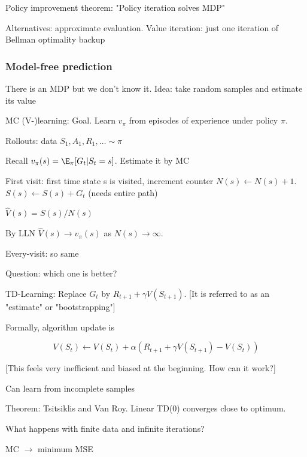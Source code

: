 \documentclass[english]{article}
\begin{document}
\item Policy improvement theorem: "Policy iteration solves MDP"

\item Alternatives: approximate evaluation. Value iteration: just one iteration of Bellman optimality backup

\eenum 


\subsubsection{Model-free prediction}
\benum

\item There is an MDP but we don't know it. Idea: take random samples and estimate its value

\item MC (V-)learning: Goal. Learn $v_\pi$ from episodes of experience under policy $\pi$. 

Rollouts: data $S_1,A_1,R_1,\ldots \sim \pi$

Recall $v_\pi(s) = \E_\pi[G_t|S_t=s]$. Estimate it by MC

\item First visit: first time state s is visited, increment counter $N(s) \gets N(s)+1$. $S(s) \gets S(s)+G_t$ (needs entire path)

$\hat V(s) = S(s)/N(s)$

By LLN $\hat V(s) \to v_\pi(s)$ as $N(s)\to \infty$. 

\item Every-visit: so same

Question: which one is better?

\item TD-Learning: Replace $G_t$ by $R_{t+1}+\gamma V(S_{t+1})$. [It is referred to as an "estimate" or "bootstrapping"]

Formally, algorithm update is

$$V(S_t) \gets V(S_t)+\alpha(R_{t+1}+
\gamma V(S_{t+1})- V(S_{t}))$$ 

[This feels very inefficient and biased at the beginning. How can it work?]

Can learn from incomplete samples

Theorem: Tsitsiklis and Van Roy. Linear TD(0) converges close to optimum. 

\item What happens with finite data and infinite iterations?

MC $\to $ minimum MSE
\end{document}
